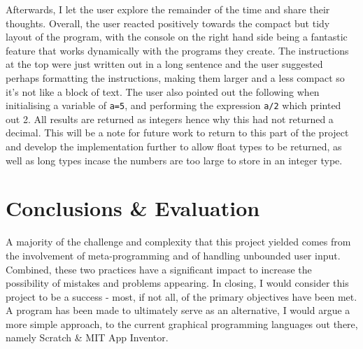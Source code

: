 \documentclass[a4paper, 12pt]{article}
\begin{document}
        Afterwards, I let the user explore the remainder of the time and share their thoughts. Overall, the
        user reacted positively towards the compact but tidy layout of the program, with the console on the
        right hand side being a fantastic feature that works dynamically with the programs they create. The
        instructions at the top were just written out in a long sentence and the user suggested perhaps
        formatting the instructions, making them larger and a less compact so it's not like a block of text.
        The user also pointed out the following when initialising a variable of \texttt{a=5}, and performing
        the expression \texttt{a/2} which printed out 2. All results are returned as integers hence why this
        had not returned a decimal. This will be a note for future work to return to this part of the project
        and develop the implementation further to allow float types to be returned, as well as long types
        incase the numbers are too large to store in an integer type.

    \clearpage
    \section{Conclusions \& Evaluation}
        A majority of the challenge and complexity that this project yielded comes from the
        involvement of meta-programming and of handling unbounded user input. Combined, these
        two practices have a significant impact to increase the possibility of mistakes and
        problems appearing. In closing, I would consider this project to be a success - most,
        if not all, of the primary objectives have been met. A program has been made to
        ultimately serve as an alternative, I would argue a more simple approach, to the
        current graphical programming languages out there, namely Scratch \& MIT App Inventor. \\
\end{document}
